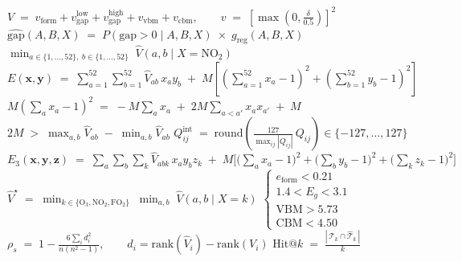 \documentclass[12pt]{article}
\begin{document}
\noindent\rule{0pt}{0pt}
$V \;=\; v_{\text{form}} + v_{\text{gap}}^{\text{low}} + v_{\text{gap}}^{\text{high}} + v_{\text{vbm}} + v_{\text{cbm}},
\qquad v \;=\; \left[\max\!\left(0,\frac{\delta}{0.5}\right)\right]^{2}$
\clearpage
$\widehat{\text{gap}}(A,B,X) \;=\; P(\text{gap}>0 \mid A,B,X)\;\times\;g_{\text{reg}}(A,B,X)$
\clearpage
$\min_{a\in\{1,\dots,52\},\; b\in\{1,\dots,52\}} \; \hat V(a,b \mid X=\mathrm{NO_2})$
\clearpage
$E(\mathbf{x},\mathbf{y}) \;=\; \sum_{a=1}^{52}\sum_{b=1}^{52} \hat V_{ab}\, x_a y_b \;+\; M\left[\left(\sum_{a=1}^{52}x_a-1\right)^{2}+\left(\sum_{b=1}^{52}y_b-1\right)^{2}\right]$
\clearpage
$M\left(\sum_a x_a-1\right)^{2} \;=\; -M\sum_a x_a \;+\; 2M\sum_{a<a'} x_a x_{a'} \;+\; M$
\clearpage
$2M \;>\; \max_{a,b}\hat V_{ab} \;-\; \min_{a,b}\hat V_{ab}$
\clearpage
$Q^{\text{int}}_{ij} \;=\; \mathrm{round}\!\left(\frac{127}{\max_{ij}|Q_{ij}|}\,Q_{ij}\right)\in\{-127,\dots,127\}$
\clearpage
$E_3(\mathbf{x},\mathbf{y},\mathbf{z}) \;=\; \sum_{a}\sum_{b}\sum_{k} \hat V_{abk}\, x_a y_b z_k \;+\; M\Big[\big(\textstyle\sum_a x_a-1\big)^2+\big(\sum_b y_b-1\big)^2+\big(\sum_k z_k-1\big)^2\Big]$
\clearpage
$\hat V^{\star} \;=\; \min_{k\in\{\mathrm{O_3},\mathrm{NO_2},\mathrm{FO_2}\}} \; \min_{a,b}\; \hat V(a,b \mid X=k)$
\clearpage
$\begin{cases}
e_{\text{form}} < 0.21\\
1.4 < E_g < 3.1\\
\mathrm{VBM} > 5.73\\
\mathrm{CBM} < 4.50
\end{cases}$
\clearpage
$\rho_s \;=\; 1-\frac{6\sum_i d_i^{2}}{n(n^{2}-1)},\qquad d_i=\mathrm{rank}(\hat V_i)-\mathrm{rank}(V_i)$
\clearpage
$\mathrm{Hit@}k \;=\; \frac{\left|\,\mathcal{T}_k \cap \hat{\mathcal{T}}_k\,\right|}{k}$
\end{document}
